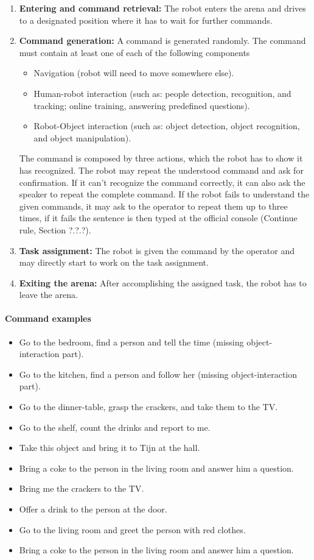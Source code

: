 \begin{enumerate}
\item \textbf{Entering and command retrieval:} The robot enters the arena and drives to a designated position where it has to wait for further commands.
\item \textbf{Command generation:} A command is generated randomly. The command must contain at least one of each of the following components
\begin{itemize}
\item Navigation (robot will need to move somewhere else).
\item Human-robot interaction (such as: people detection, recognition, and tracking; online training, answering predefined questions).
\item Robot-Object interaction (such as: object detection, object recognition, and object manipulation).
\end{itemize}
The command is composed by three actions, which the robot has to show it has recognized. The robot may repeat the understood command and ask for confirmation. If it can't recognize the command correctly, it can also ask the speaker to repeat the complete command. If the robot fails to understand the given commands, it may ask to the operator to repeat them up to three times, if it fails the sentence is then typed at the official console (Continue rule, Section ?.?.?).
\item \textbf{Task assignment:} The robot is given the command by the operator and may directly start to work on the task assignment.
\item \textbf{Exiting the arena:} After accomplishing the assigned task, the robot has to leave the arena.
\end{enumerate}

\paragraph{Command examples}
\begin{itemize}
\item Go to the bedroom, find a person and tell the time (missing object-interaction part).
\item Go to the kitchen, find a person and follow her (missing object-interaction part).
\item Go to the dinner-table, grasp the crackers, and take them to the TV.
\item Go to the shelf, count the drinks and report to me.
\item Take this object and bring it to Tijn at the hall.
\item Bring a coke to the person in the living room and answer him a question.
\item Bring me the crackers to the TV.
\item Offer a drink to the person at the door.
\item Go to the living room and greet the person with red clothes.
\item Bring a coke to the person in the living room and answer him a question.
\end{itemize}

